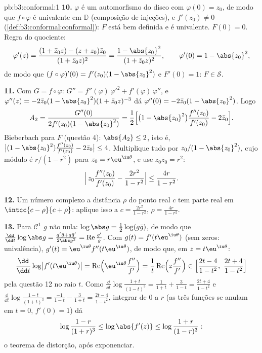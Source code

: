 \begin{solution}{pb:b3:conformal:1}
\textbf{10.} $\varphi$ é um automorfismo do disco com
$\varphi(0) = z_0$, de modo que $f\circ\varphi$ é univalente em
$\mathbb D$ (composição de injeções), e $f'(z_0) \neq
0$ (\cref{def:b3:conformal:conformal}): $F$ está bem definida
e é univalente. $F(0) = 0$. Regra do quociente:
\[
\varphi'(z) = \frac{(1 + \bar z_0z) - (z + z_0)\bar z_0}
{(1 + \bar z_0z)^2}
= \frac{1 - \abs{z_0}^2}{(1 + \bar z_0z)^2},
\qquad \varphi'(0) = 1 - \abs{z_0}^2 ,
\]
de modo que $(f\circ\varphi)'(0) = f'(z_0)(1 - \abs{z_0}^2)$ e
$F'(0) = 1$: $F \in \mathcal S$.

\textbf{11.} Com $G = f\circ\varphi$: $G'' =
f''(\varphi)\,\varphi'^2 + f'(\varphi)\,\varphi''$, e
$\varphi''(z) = -2\bar z_0(1 - \abs{z_0}^2)(1 + \bar
z_0z)^{-3}$ dá $\varphi''(0) = -2\bar z_0(1 -
\abs{z_0}^2)$. Logo
\[
A_2 = \frac{G''(0)}{2f'(z_0)(1 - \abs{z_0}^2)}
= \frac12\Bigl[\bigl(1 - \abs{z_0}^2\bigr)
\frac{f''(z_0)}{f'(z_0)} - 2\bar z_0\Bigr] .
\]
Bieberbach para $F$ (questão 4): $\abs{A_2} \leq 2$, isto é,
$\bigl|(1 - \abs{z_0}^2)\frac{f''(z_0)}{f'(z_0)} - 2\bar
z_0\bigr| \leq 4$. Multiplique tudo por
$z_0/(1 - \abs{z_0}^2)$, cujo módulo é
$r/(1 - r^2)$ para $z_0 = r\eu^{\iu\theta}$, e use $z_0\bar
z_0 = r^2$:
\[
\Bigl|\,z_0\frac{f''(z_0)}{f'(z_0)} -
\frac{2r^2}{1 - r^2}\Bigr| \leq \frac{4r}{1 - r^2} .
\]

\textbf{12.} Um número complexo a distância $\rho$ do
ponto real $c$ tem parte real em $\intcc{c - \rho}{c +
\rho}$: aplique isso a $c = \frac{2r^2}{1-r^2}$, $\rho =
\frac{4r}{1-r^2}$.

\textbf{13.} Para $\mathcal C^1$ $g$ não nula:
$\log\abs g = \frac12\log(g\bar g)$, de modo que $\frac{\dd}{\dd
t}\log\abs g = \frac{g'\bar g + g\bar g'}{2\abs g^2} =
\operatorname{Re}\frac{g'}g$. Com $g(t) =
f'(t\eu^{\iu\theta})$ (sem zeros: univalência), $g'(t) =
\eu^{\iu\theta}f''(t\eu^{\iu\theta})$, de modo que, em $z =
t\eu^{\iu\theta}$:
\[
\frac{\dd}{\dd t}\log\bigl|f'(t\eu^{\iu\theta})\bigr|
= \operatorname{Re}\Bigl(\eu^{\iu\theta}
\frac{f''}{f'}\Bigr)
= \frac1t\operatorname{Re}\Bigl(z\frac{f''}{f'}\Bigr)
\in \Bigl[\frac{2t - 4}{1 - t^2},\
\frac{2t + 4}{1 - t^2}\Bigr]
\]
pela questão 12 no raio $t$. Como $\frac{\dd}{\dd
t}\log\frac{1+t}{(1-t)^3} = \frac1{1+t} + \frac3{1-t} =
\frac{2t+4}{1-t^2}$ e $\frac{\dd}{\dd
t}\log\frac{1-t}{(1+t)^3} = \frac{-1}{1-t} - \frac3{1+t} =
\frac{2t-4}{1-t^2}$, integrar de $0$ a $r$ (as três
funções se anulam em $t = 0$, $f'(0) = 1$) dá
\[
\log\frac{1-r}{(1+r)^3} \leq \log\abs{f'(z)} \leq
\log\frac{1+r}{(1-r)^3} :
\]
o teorema de distorção, após exponenciar.


\end{solution}
